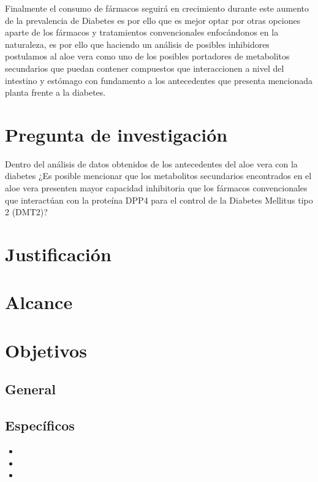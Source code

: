Finalmente el consumo de fármacos seguirá en crecimiento durante este aumento de la prevalencia de Diabetes es por ello que es mejor optar por otras opciones aparte de los fármacos y tratamientos convencionales enfocándonos en la naturaleza, es por ello que haciendo un análisis de posibles inhibidores postulamos al aloe vera como uno de los posibles portadores de metabolitos secundarios que puedan contener compuestos que interaccionen a nivel del intestino y estómago con fundamento a los antecedentes que presenta mencionada planta frente a la diabetes.

\section{Pregunta de investigación}
Dentro del análisis de datos obtenidos de los antecedentes del aloe vera con la diabetes ¿Es posible mencionar que los metabolitos secundarios encontrados en el aloe vera presenten mayor capacidad inhibitoria que los  fármacos convencionales que interactúan con la proteína DPP4 para el control de la Diabetes Mellitus tipo 2 (DMT2)?

\section{Justificación}


\section{Alcance}


\section{Objetivos}

\subsection{General}


\subsection{Específicos}

\begin{itemize}
 \item 
\item 
\item 

\end{itemize}

